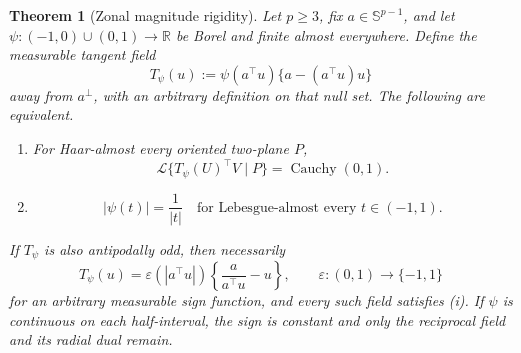 \documentclass[10pt,a4paper]{amsart}
\newtheorem{theorem}{Theorem}
\newcommand{\Cauchy}{\operatorname{Cauchy}}
\newcommand{\Law}{\mathcal L}
\newcommand{\R}{\mathbb R}
\newcommand{\sphere}{\mathbb S}
\begin{document}
\begin{theorem}[Zonal magnitude rigidity]
\label{thm:zonal-rigidity}
Let \(p\geq3\), fix \(a\in\sphere^{p-1}\), and let
\(\psi:(-1,0)\cup(0,1)\to\R\) be Borel and finite almost everywhere.
Define the measurable tangent field
\begin{equation}
  T_\psi(u)
  :=
  \psi(a^\top u)\{a-(a^\top u)u\}
  \label{eq:zonal-field}
\end{equation}
away from \(a^\perp\), with an arbitrary definition on that null set.
The following are equivalent.
\begin{enumerate}[label=\textup{(\roman*)}]
\item For Haar-almost every oriented two-plane \(P\),
  \[
    \Law\{T_\psi(U)^\top V\mid P\}=\Cauchy(0,1).
  \]
\item
  \[
    |\psi(t)|=\frac1{|t|}
    \quad\text{for Lebesgue-almost every }t\in(-1,1).
  \]
\end{enumerate}
If \(T_\psi\) is also antipodally odd, then necessarily
\begin{equation}
  T_\psi(u)
  =
  \varepsilon(|a^\top u|)
  \left\{\frac{a}{a^\top u}-u\right\},
  \qquad
  \varepsilon:(0,1)\to\{-1,1\}
  \label{eq:zonal-sign-family}
\end{equation}
for an arbitrary measurable sign function, and every such field satisfies
\textup{(i)}.  If \(\psi\) is continuous on each half-interval, the sign is
constant and only the reciprocal field and its radial dual remain.
\end{theorem}
\end{document}
